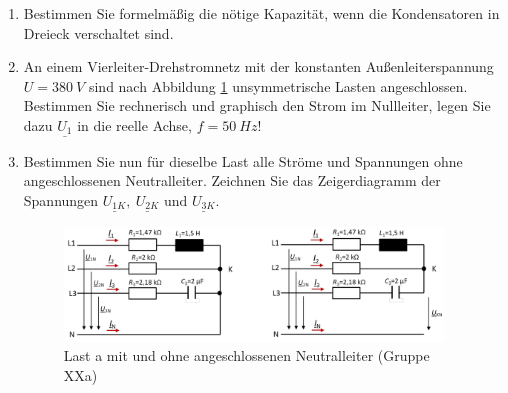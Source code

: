 \begin{enumerate}[label=\alph*)]
  \item Bestimmen Sie formelmäßig die nötige Kapazität, wenn die Kondensatoren in Dreieck verschaltet sind.

  \item An einem Vierleiter-Drehstromnetz mit der konstanten Außenleiterspannung $U = 380\ V$ sind nach Abbildung \ref{img2.6.1} unsymmetrische Lasten angeschlossen. Bestimmen Sie rechnerisch und graphisch den Strom im Nullleiter, legen Sie dazu $\underline{U_1}$ in die reelle Achse, $f = 50\ Hz$!

\item Bestimmen Sie nun für dieselbe Last alle Ströme und Spannungen ohne angeschlossenen Neutralleiter. Zeichnen Sie das Zeigerdiagramm der Spannungen $\underline{U_{1K}},\ \underline{U_{2K}} \text{ und } \underline{U_{3K}}$. 
  \begin{figure}[h!]
    \begin{center}
      \includegraphics[width=0.95\textwidth]{img/img2.6.1.png}
    \end{center}
    \caption{Last a mit und ohne angeschlossenen Neutralleiter (Gruppe XXa)}\label{img2.6.1}
  \end{figure}
  
\end{enumerate}
